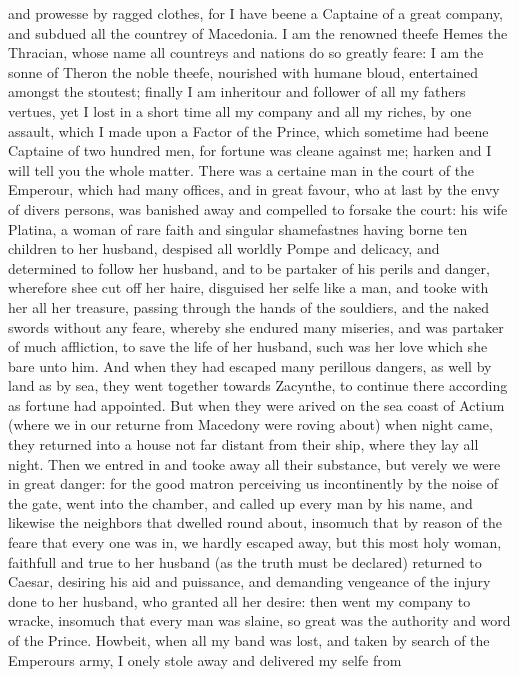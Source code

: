 and prowesse by ragged clothes, for I have beene a Captaine of a great company,
and subdued all the countrey of Macedonia. I am the renowned theefe Hemes the
Thracian, whose name all countreys and nations do so greatly feare: I am the
sonne of Theron the noble theefe, nourished with humane bloud, entertained
amongst the stoutest; finally I am inheritour and follower of all my fathers
vertues, yet I lost in a short time all my company and all my riches, by one
assault, which I made upon a Factor of the Prince, which sometime had beene
Captaine of two hundred men, for fortune was cleane against me; harken and I
will tell you the whole matter. There was a certaine man in the court of the
Emperour, which had many offices, and in great favour, who at last by the envy
of divers persons, was banished away and compelled to forsake the court: his
wife Platina, a woman of rare faith and singular shamefastnes having borne ten
children to her husband, despised all worldly Pompe and delicacy, and
determined to follow her husband, and to be partaker of his perils and danger,
wherefore shee cut off her haire, disguised her selfe like a man, and tooke
with her all her treasure, passing through the hands of the souldiers, and the
naked swords without any feare, whereby she endured many miseries, and was
partaker of much affliction, to save the life of her husband, such was her love
which she bare unto him. And when they had escaped many perillous dangers, as
well by land as by sea, they went together towards Zacynthe, to continue there
according as fortune had appointed. But when they were arived on the sea coast
of Actium (where we in our returne from Macedony were roving about) when night
came, they returned into a house not far distant from their ship, where they
lay all night. Then we entred in and tooke away all their substance, but verely
we were in great danger: for the good matron perceiving us incontinently by the
noise of the gate, went into the chamber, and called up every man by his name,
and likewise the neighbors that dwelled round about, insomuch that by reason of
the feare that every one was in, we hardly escaped away, but this most holy
woman, faithfull and true to her husband (as the truth must be declared)
returned to Caesar, desiring his aid and puissance, and demanding vengeance of
the injury done to her husband, who granted all her desire: then went my
company to wracke, insomuch that every man was slaine, so great was the
authority and word of the Prince. Howbeit, when all my band was lost, and taken
by search of the Emperours army, I onely stole away and delivered my selfe from
